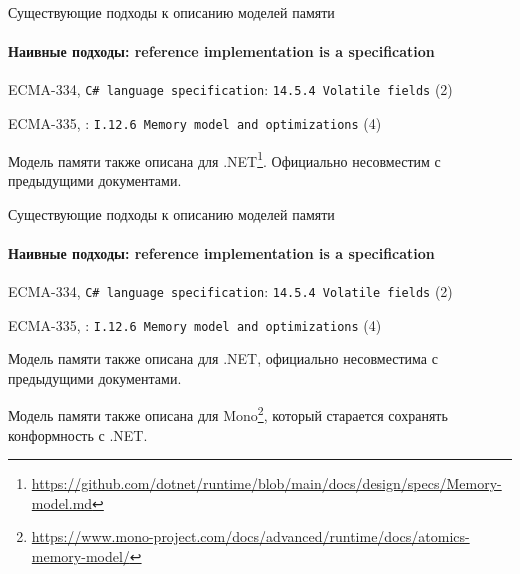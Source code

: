 \begin{frame}[t,noframenumbering]{Существующие подходы к описанию моделей памяти}
\framesubtitle{Наивные подходы: reference implementation is a specification}

{\small
ECMA-334, \texttt{C\# language specification}: \texttt{14.5.4 Volatile fields} (2)
}

{\small
ECMA-335, : \texttt{I.12.6 Memory model and optimizations} (4)
}

Модель памяти также описана для .NET\footnote{\tiny\url{https://github.com/dotnet/runtime/blob/main/docs/design/specs/Memory-model.md}}.
\pause
Официально несовместим с предыдущими документами.

\end{frame}

\begin{frame}[t,noframenumbering]{Существующие подходы к описанию моделей памяти}
\framesubtitle{Наивные подходы: reference implementation is a specification}

{\small
ECMA-334, \texttt{C\# language specification}: \texttt{14.5.4 Volatile fields} (2)
}

{\small
ECMA-335, : \texttt{I.12.6 Memory model and optimizations} (4)
}

Модель памяти также описана для .NET, официально несовместима с предыдущими документами.

\pause
Модель памяти также описана для Mono\footnote{\tiny\url{https://www.mono-project.com/docs/advanced/runtime/docs/atomics-memory-model/}}, который старается сохранять конформность с .NET.
\end{frame}


